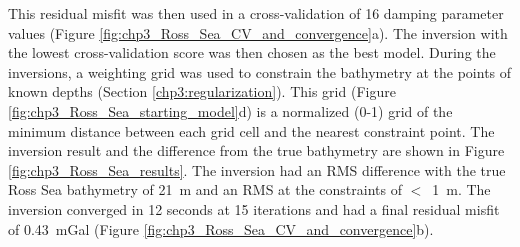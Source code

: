 
This residual misfit was then used in a cross-validation of 16 damping parameter values (Figure \ref{fig:chp3_Ross_Sea_CV_and_convergence}a). The inversion with the lowest cross-validation score was then chosen as the best model. During the inversions, a weighting grid was used to constrain the bathymetry at the points of known depths (Section \ref{chp3:regularization}). This grid (Figure \ref{fig:chp3_Ross_Sea_starting_model}d) is a normalized (0-1) grid of the minimum distance between each grid cell and the nearest constraint point. The inversion result and the difference from the true bathymetry are shown in Figure \ref{fig:chp3_Ross_Sea_results}. The inversion had an RMS difference with the true Ross Sea bathymetry of 21~m and an RMS at the constraints of $<$~1~m. The inversion converged in 12 seconds at 15 iterations and had a final residual misfit of 0.43~mGal (Figure \ref{fig:chp3_Ross_Sea_CV_and_convergence}b).  \\ 

